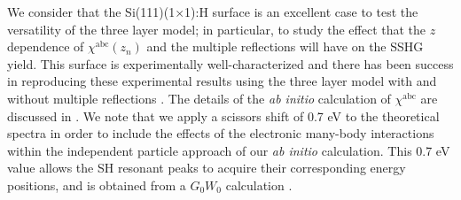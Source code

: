 \documentclass[utf8]{frontiersSCNS}
\begin{document}
We consider that the Si(111)(1$\times$1):H surface is an excellent case to test
the versatility of the three layer model; in particular, to study the effect
that the $z$ dependence of $\chi^{\mathrm{abc}}(z_{n})$ and the multiple
reflections will have on the SSHG yield. This surface is experimentally
well-characterized \citep{mitchellSS01, mejiaPRB02, bergfeldPRL04} and there has
been success in reproducing these experimental results using the three layer
model with and without multiple reflections \citep{andersonPRB16a,
andersonPRB16b}. The details of the \emph{ab initio} calculation of
$\chi^{\mathrm{abc}}$ are discussed in \cite{andersonPRB16a}. We note that we
apply a scissors shift of 0.7 eV to the theoretical spectra in order to include
the effects of the electronic many-body interactions within the independent
particle approach of our \emph{ab initio} calculation. This 0.7 eV value allows
the SH resonant peaks to acquire their corresponding energy positions, and is
obtained from a $G_{0}W_{0}$ calculation \citep{liPRB10, andersonPRB16a}.
\end{document}
